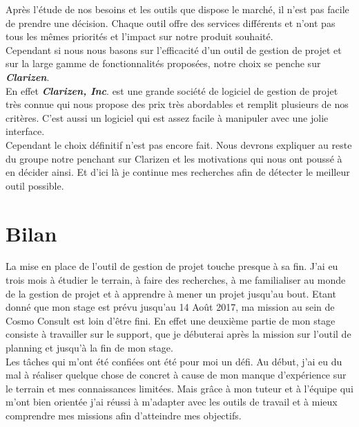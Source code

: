 \documentclass[11pt]{report}
\begin{document}
\hspace{1cm} Après l’étude de nos besoins et les outils que dispose le marché, il n’est pas facile de prendre une décision. Chaque outil offre des services différents et n’ont pas tous les mêmes priorités et l’impact sur notre produit souhaité.\\

\hspace{1cm} Cependant si nous nous basons sur l’efficacité d’un outil de gestion de projet et sur la large gamme de fonctionnalités proposées, notre choix se penche sur \textbf{\textit{Clarizen}}.\\
En effet \textbf{\textit{Clarizen, Inc}}. est une grande société de logiciel de gestion de projet très connue qui nous propose des prix très abordables et remplit plusieurs de nos critères. C’est aussi un logiciel qui est assez facile à manipuler avec une jolie interface.\\

\hspace{1cm} Cependant le choix définitif n’est pas encore fait. Nous devrons expliquer au reste du groupe notre penchant sur Clarizen et les motivations qui nous ont poussé à en décider ainsi. Et d’ici là je continue mes recherches afin de détecter le meilleur outil possible.

\newpage		
\section{Bilan}
\hspace{1cm} La mise en place de l’outil de gestion de projet touche presque à sa fin. J’ai eu trois mois à étudier le terrain, à faire des recherches, à me familialiser au monde de la gestion de projet et à apprendre à mener un projet jusqu’au bout. Etant donné que mon stage est prévu jusqu’au 14 Août 2017, ma mission au sein de Cosmo Consult est loin d’être fini. En effet une deuxième partie de mon stage consiste à travailler sur le support, que je débuterai après la mission sur l’outil de planning et jusqu’à la fin de mon stage.\\

\hspace{1cm} Les tâches qui m’ont été confiées ont été pour moi un défi. Au début, j’ai eu du mal à réaliser quelque chose de concret à cause de mon manque d’expérience sur le terrain et mes connaissances limitées. Mais grâce à mon tuteur et à l’équipe qui m’ont bien orientée j’ai réussi à m’adapter avec les outils de travail et à mieux comprendre mes missions afin d’atteindre mes objectifs.\\
\end{document}
